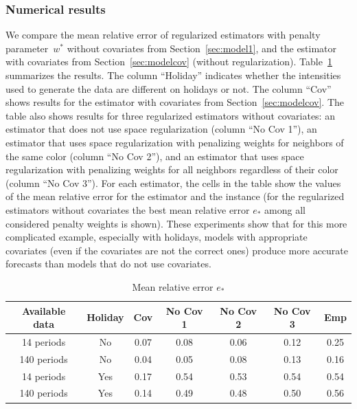 \documentclass[article]{jss}
\begin{document}
\subsubsection{Numerical results}

We compare the mean relative error of regularized estimators with penalty parameter~$w^*$ without covariates from Section~\ref{sec:model1}, and the estimator with covariates from Section~\ref{sec:modelcov} (without regularization).
Table~\ref{tablecompwomodels} summarizes the results.
The column ``Holiday'' indicates whether the intensities used to generate the data are different on holidays or not.
The column ``Cov'' shows results for the estimator with covariates from Section~\ref{sec:modelcov}.
The table also shows results for three regularized estimators without covariates:
an estimator that does not use space regularization (column ``No Cov 1''),
an estimator that uses space regularization with penalizing weights for neighbors of the same color (column ``No Cov 2''), and
an estimator that uses space regularization with penalizing weights for all neighbors regardless of their color (column ``No Cov 3'').
For each estimator, the cells in the table show the values of the mean relative error for the estimator and the instance (for the regularized estimators without covariates the best mean relative error $e_{*}$ among all considered penalty weights is shown).
These experiments show that for this more complicated example, especially with holidays, models with appropriate covariates (even if the covariates are not the correct ones) produce more accurate forecasts than models that do not use covariates.

\begin{table}
\centering
\begin{tabular}{|c|c|c|c|c|c|c|}
\hline
Available data & Holiday &   Cov &  No Cov 1 &  No Cov 2 &  No Cov 3 & Emp  \\
\hline
14 periods & No &  0.07 & 0.08 & 0.06 & 0.12 & 0.25\\
\hline
140 periods & No &  0.04 & 0.05 & 0.08 & 0.13 & 0.16\\
\hline
\hline
14 periods & Yes &  0.17  & 0.54 & 0.53 & 0.54 & 0.54\\
\hline
140 periods & Yes &  0.14 & 0.49 & 0.48 & 0.50 & 0.56\\
\hline
\end{tabular}
\caption{Mean relative error $e_{*}$}
\label{tablecompwomodels}
\end{table}
\end{document}

